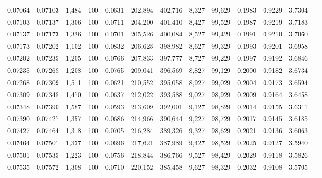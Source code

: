 \begin{tabular}{rrrrrrrrrrrrr}
0.07064 & 0.07103 & 1,484 & 100 &                                     0.0631 & 202,894 & 402,716 &   8,327 &  99,629 & 0.1983 & 0.9229 & 3.7304 \\
0.07103 & 0.07137 & 1,306 & 100 &                                     0.0711 & 204,200 & 401,410 &   8,427 &  99,529 & 0.1987 & 0.9219 & 3.7183 \\
0.07137 & 0.07173 & 1,326 & 100 &                                     0.0701 & 205,526 & 400,084 &   8,527 &  99,429 & 0.1991 & 0.9210 & 3.7060 \\
0.07173 & 0.07202 & 1,102 & 100 &                                     0.0832 & 206,628 & 398,982 &   8,627 &  99,329 & 0.1993 & 0.9201 & 3.6958 \\
0.07202 & 0.07235 & 1,205 & 100 &                                     0.0766 & 207,833 & 397,777 &   8,727 &  99,229 & 0.1997 & 0.9192 & 3.6846 \\
0.07235 & 0.07268 & 1,208 & 100 &                                     0.0765 & 209,041 & 396,569 &   8,827 &  99,129 & 0.2000 & 0.9182 & 3.6734 \\
0.07268 & 0.07309 & 1,511 & 100 &                                     0.0621 & 210,552 & 395,058 &   8,927 &  99,029 & 0.2004 & 0.9173 & 3.6594 \\
0.07309 & 0.07348 & 1,470 & 100 &                                     0.0637 & 212,022 & 393,588 &   9,027 &  98,929 & 0.2009 & 0.9164 & 3.6458 \\
0.07348 & 0.07390 & 1,587 & 100 &                                     0.0593 & 213,609 & 392,001 &   9,127 &  98,829 & 0.2014 & 0.9155 & 3.6311 \\
0.07390 & 0.07427 & 1,357 & 100 &                                     0.0686 & 214,966 & 390,644 &   9,227 &  98,729 & 0.2017 & 0.9145 & 3.6185 \\
0.07427 & 0.07464 & 1,318 & 100 &                                     0.0705 & 216,284 & 389,326 &   9,327 &  98,629 & 0.2021 & 0.9136 & 3.6063 \\
0.07464 & 0.07501 & 1,337 & 100 &                                     0.0696 & 217,621 & 387,989 &   9,427 &  98,529 & 0.2025 & 0.9127 & 3.5940 \\
0.07501 & 0.07535 & 1,223 & 100 &                                     0.0756 & 218,844 & 386,766 &   9,527 &  98,429 & 0.2029 & 0.9118 & 3.5826 \\
0.07535 & 0.07572 & 1,308 & 100 &                                     0.0710 & 220,152 & 385,458 &   9,627 &  98,329 & 0.2032 & 0.9108 & 3.5705 \\

\end{tabular}
